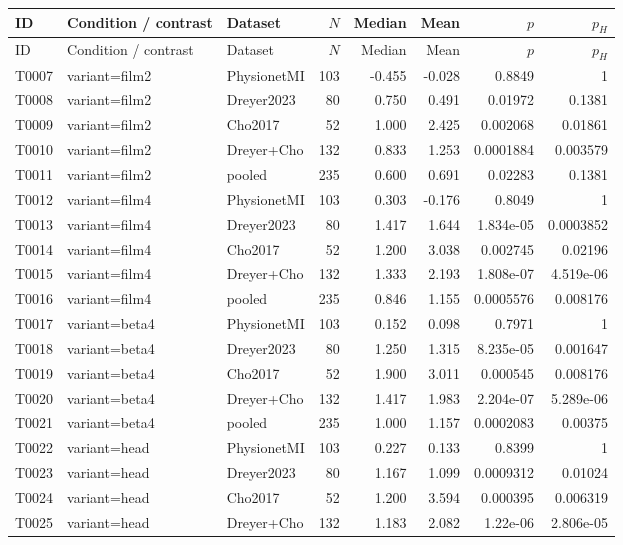 \begin{longtable}{p{.45in}p{2.6in}p{.75in}rrrrr}
\toprule
ID & Condition / contrast & Dataset & $N$ & Median & Mean & $p$ & $p_H$ \\
\midrule
\endfirsthead
\toprule
ID & Condition / contrast & Dataset & $N$ & Median & Mean & $p$ & $p_H$ \\
\midrule
\endhead
T0007 & variant=film2 & PhysionetMI & 103 & -0.455 & -0.028 & 0.8849 & 1 \\
T0008 & variant=film2 & Dreyer2023 & 80 & 0.750 & 0.491 & 0.01972 & 0.1381 \\
T0009 & variant=film2 & Cho2017 & 52 & 1.000 & 2.425 & 0.002068 & 0.01861 \\
T0010 & variant=film2 & Dreyer+Cho & 132 & 0.833 & 1.253 & 0.0001884 & 0.003579 \\
T0011 & variant=film2 & pooled & 235 & 0.600 & 0.691 & 0.02283 & 0.1381 \\
T0012 & variant=film4 & PhysionetMI & 103 & 0.303 & -0.176 & 0.8049 & 1 \\
T0013 & variant=film4 & Dreyer2023 & 80 & 1.417 & 1.644 & 1.834e-05 & 0.0003852 \\
T0014 & variant=film4 & Cho2017 & 52 & 1.200 & 3.038 & 0.002745 & 0.02196 \\
T0015 & variant=film4 & Dreyer+Cho & 132 & 1.333 & 2.193 & 1.808e-07 & 4.519e-06 \\
T0016 & variant=film4 & pooled & 235 & 0.846 & 1.155 & 0.0005576 & 0.008176 \\
T0017 & variant=beta4 & PhysionetMI & 103 & 0.152 & 0.098 & 0.7971 & 1 \\
T0018 & variant=beta4 & Dreyer2023 & 80 & 1.250 & 1.315 & 8.235e-05 & 0.001647 \\
T0019 & variant=beta4 & Cho2017 & 52 & 1.900 & 3.011 & 0.000545 & 0.008176 \\
T0020 & variant=beta4 & Dreyer+Cho & 132 & 1.417 & 1.983 & 2.204e-07 & 5.289e-06 \\
T0021 & variant=beta4 & pooled & 235 & 1.000 & 1.157 & 0.0002083 & 0.00375 \\
T0022 & variant=head & PhysionetMI & 103 & 0.227 & 0.133 & 0.8399 & 1 \\
T0023 & variant=head & Dreyer2023 & 80 & 1.167 & 1.099 & 0.0009312 & 0.01024 \\
T0024 & variant=head & Cho2017 & 52 & 1.200 & 3.594 & 0.000395 & 0.006319 \\
T0025 & variant=head & Dreyer+Cho & 132 & 1.183 & 2.082 & 1.22e-06 & 2.806e-05 \\

\end{longtable}
